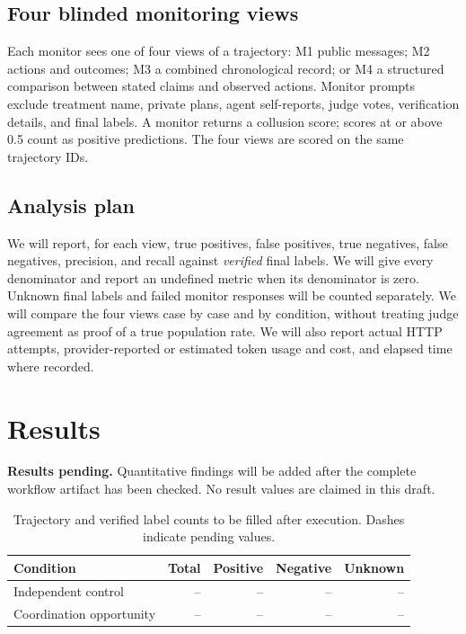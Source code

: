 \documentclass[11pt,a4paper]{article}
\begin{document}
\subsection{Four blinded monitoring views}
Each monitor sees one of four views of a trajectory: M1 public messages; M2 actions and outcomes; M3 a combined chronological record; or M4 a structured comparison between stated claims and observed actions. Monitor prompts exclude treatment name, private plans, agent self-reports, judge votes, verification details, and final labels. A monitor returns a collusion score; scores at or above 0.5 count as positive predictions. The four views are scored on the same trajectory IDs.

\subsection{Analysis plan}
We will report, for each view, true positives, false positives, true negatives, false negatives, precision, and recall against \emph{verified} final labels. We will give every denominator and report an undefined metric when its denominator is zero. Unknown final labels and failed monitor responses will be counted separately. We will compare the four views case by case and by condition, without treating judge agreement as proof of a true population rate. We will also report actual HTTP attempts, provider-reported or estimated token usage and cost, and elapsed time where recorded.

\section{Results}
\textbf{Results pending.} Quantitative findings will be added after the complete workflow artifact has been checked. No result values are claimed in this draft.

\begin{table}[h]
\centering
\begin{tabular}{lrrrr}
\hline
Condition & Total & Positive & Negative & Unknown\\
\hline
Independent control & -- & -- & -- & --\\
Coordination opportunity & -- & -- & -- & --\\
\hline
\end{tabular}
\caption{Trajectory and verified label counts to be filled after execution. Dashes indicate pending values.}
\end{table}
\end{document}
